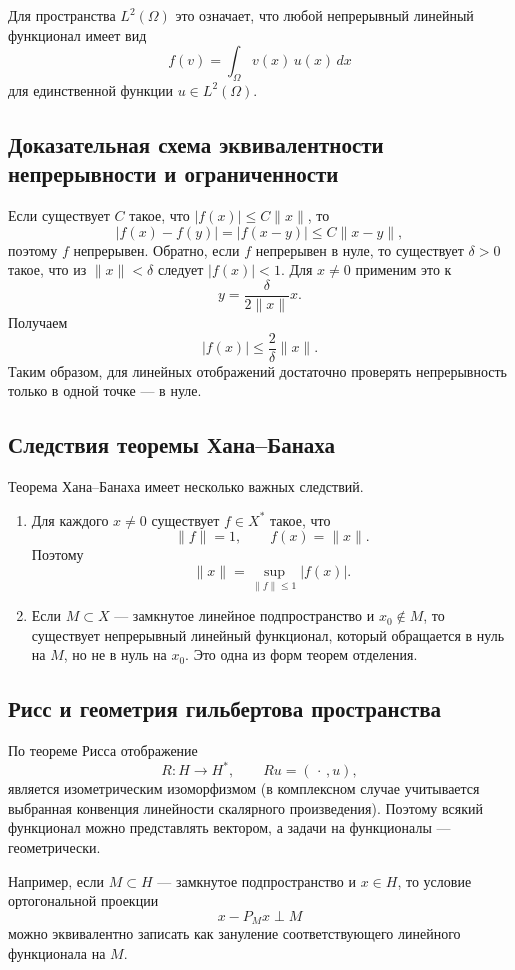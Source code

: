 Для пространства $L^2(\Omega)$ это означает, что любой непрерывный линейный
функционал имеет вид
\[
    f(v)=\int_\Omega v(x)\,u(x)\,dx
\]
для единственной функции $u\in L^2(\Omega)$.


\subsection{Доказательная схема эквивалентности непрерывности и ограниченности}

Если существует $C$ такое, что $|f(x)|\le C\|x\|$, то
\[
|f(x)-f(y)|=|f(x-y)|\le C\|x-y\|,
\]
поэтому $f$ непрерывен. Обратно, если $f$ непрерывен в нуле, то существует
$\delta>0$ такое, что из $\|x\|<\delta$ следует $|f(x)|<1$. Для $x\ne0$
применим это к
\[
    y=\frac{\delta}{2\|x\|}x.
\]
Получаем
\[
    |f(x)|\le \frac{2}{\delta}\|x\|.
\]
Таким образом, для линейных отображений достаточно проверять непрерывность только
в одной точке --- в нуле.

\subsection{Следствия теоремы Хана--Банаха}

Теорема Хана--Банаха имеет несколько важных следствий.
\begin{enumerate}
    \item Для каждого $x\ne0$ существует $f\in X^*$ такое, что
    \[
        \|f\|=1,\qquad f(x)=\|x\|.
    \]
    Поэтому
    \[
        \|x\|=\sup_{\|f\|\le1}|f(x)|.
    \]
    \item Если $M\subset X$ --- замкнутое линейное подпространство и
    $x_0\notin M$, то существует непрерывный линейный функционал, который
    обращается в нуль на $M$, но не в нуль на $x_0$. Это одна из форм
    теорем отделения.
\end{enumerate}

\subsection{Рисс и геометрия гильбертова пространства}

По теореме Рисса отображение
\[
    R:H\to H^*,\qquad Ru=(\,\cdot\,,u),
\]
является изометрическим изоморфизмом (в комплексном случае учитывается выбранная
конвенция линейности скалярного произведения). Поэтому всякий функционал можно
представлять вектором, а задачи на функционалы --- геометрически.

Например, если $M\subset H$ --- замкнутое подпространство и $x\in H$, то условие
ортогональной проекции
\[
    x-P_Mx\perp M
\]
можно эквивалентно записать как зануление соответствующего линейного функционала
на $M$.

